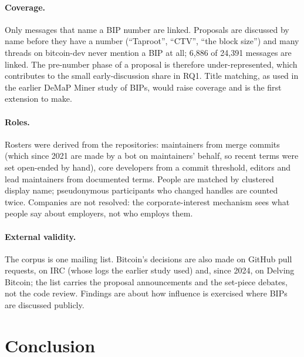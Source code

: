 \documentclass[sigconf,screen]{acmart}
\begin{document}
\paragraph{Coverage.} Only messages that name a BIP number are linked. Proposals are discussed by name before they have a number (``Taproot'', ``CTV'', ``the block size'') and many threads on bitcoin-dev never mention a BIP at all; 6,886 of 24,391 messages are linked. The pre-number phase of a proposal is therefore under-represented, which contributes to the small early-discussion share in RQ1. Title matching, as used in the earlier DeMaP Miner study of BIPs, would raise coverage and is the first extension to make.

\paragraph{Roles.} Rosters were derived from the repositories: maintainers from merge commits (which since 2021 are made by a bot on maintainers' behalf, so recent terms were set open-ended by hand), core developers from a commit threshold, editors and lead maintainers from documented terms. People are matched by clustered display name; pseudonymous participants who changed handles are counted twice. Companies are not resolved: the corporate-interest mechanism sees what people say about employers, not who employs them.

\paragraph{External validity.} The corpus is one mailing list. Bitcoin's decisions are also made on GitHub pull requests, on IRC (whose logs the earlier study used) and, since 2024, on Delving Bitcoin; the list carries the proposal announcements and the set-piece debates, not the code review. Findings are about how influence is exercised where BIPs are discussed publicly.

\section{Conclusion}
\end{document}
